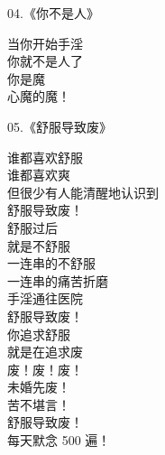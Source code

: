 \documentclass{ctexart}
\begin{document}
\begin{multicols}{2}
    \begin{center}
        04.《你不是人》\it

        当你开始手淫 \\ 你就不是人了 \\ 你是魔 \\ 心魔的魔！
    \end{center}

    \begin{center}
        05.《舒服导致废》\it

        谁都喜欢舒服 \\ 谁都喜欢爽 \\ 但很少有人能清醒地认识到 \\ 舒服导致废！ \\ 舒服过后 \\ 就是不舒服 \\ 一连串的不舒服 \\ 一连串的痛苦折磨 \\ 手淫通往医院 \\ 舒服导致废！ \\ 你追求舒服 \\ 就是在追求废 \\ 废！废！废！ \\ 未婚先废！ \\ 苦不堪言！ \\ 舒服导致废！ \\ 每天默念 500 遍！
    \end{center}
\end{multicols}
\end{document}
